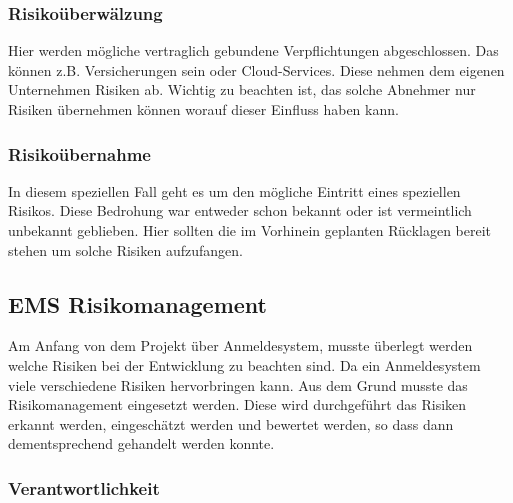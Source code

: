 \subsubsection{Risikoüberwälzung}
Hier werden mögliche vertraglich gebundene Verpflichtungen abgeschlossen. Das können z.B. Versicherungen sein oder Cloud-Services. Diese nehmen dem eigenen Unternehmen Risiken ab. Wichtig zu beachten ist, das solche Abnehmer nur Risiken übernehmen können worauf dieser Einfluss haben kann.

\subsubsection{Risikoübernahme}
In diesem speziellen Fall geht es um den mögliche Eintritt eines speziellen Risikos. Diese Bedrohung war entweder schon bekannt oder ist vermeintlich unbekannt geblieben. Hier sollten die im Vorhinein geplanten Rücklagen bereit stehen um solche Risiken aufzufangen.

\subsection{EMS Risikomanagement}
Am Anfang von dem Projekt über Anmeldesystem, musste überlegt werden welche Risiken bei der Entwicklung zu beachten sind. Da ein Anmeldesystem viele verschiedene Risiken hervorbringen kann. Aus dem Grund musste das Risikomanagement eingesetzt werden. Diese wird durchgeführt das Risiken erkannt werden, eingeschätzt werden und bewertet werden, so dass dann dementsprechend gehandelt werden konnte.

\subsubsection{Verantwortlichkeit}